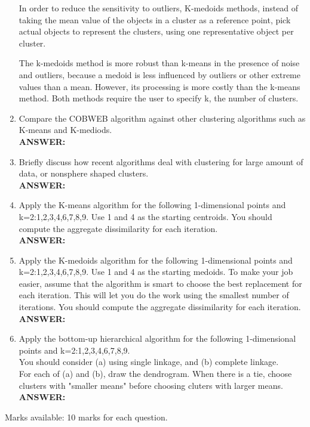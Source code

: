 \documentclass{article}
\begin{document}
\begin{enumerate}
In order to reduce the sensitivity to outliers, K-medoids methods,
instead of taking the mean value of the objects in a cluster as a
reference point, pick actual objects to represent the clusters, using
one representative object per cluster.

The k-medoids method is more robust than k-means in the presence of
noise and outliers, because a medoid is less influenced by outliers or
other extreme values than a mean. However, its processing is more
costly than the k-means method. Both methods require the user to
specify k, the number of clusters.


\item Compare the COBWEB algorithm against other clustering algorithms
  such as K-means and K-mediods. \\
\textbf{ANSWER:} \\


\item Briefly discuss how recent algorithms deal with clustering for
  large amount of data, or nonsphere shaped clusters.  \\
\textbf{ANSWER:} \\

\item Apply the K-means algorithm for the following 1-dimensional
  points and k=2:1,2,3,4,6,7,8,9. Use 1 and 4 as the starting
  centroids. You should compute the aggregate dissimilarity for each
  iteration. \\
\textbf{ANSWER:} \\

\item Apply the K-medoids algorithm for the following 1-dimensional
  points and k=2:1,2,3,4,6,7,8,9. Use 1 and 4 as the starting medoids.
  To make your job easier, assume that the algorithm is smart to
  choose the best replacement for each iteration. This will let you do
  the work using the smallest number of iterations. You should compute
  the aggregate dissimilarity for each iteration.\\ 
\textbf{ANSWER:} \\

\item Apply the bottom-up hierarchical algorithm for the following
  1-dimensional points and k=2:1,2,3,4,6,7,8,9.\\
  You should consider (a) using single linkage, and (b) complete
  linkage.\\ 
  For each of (a) and (b), draw the dendrogram. When there is a tie,
  choose clusters with "smaller means" before choosing cluters with
  larger means. \\
\textbf{ANSWER:} \\

\end{enumerate} %

Marks available: 10 marks for each question. 
\end{document}
